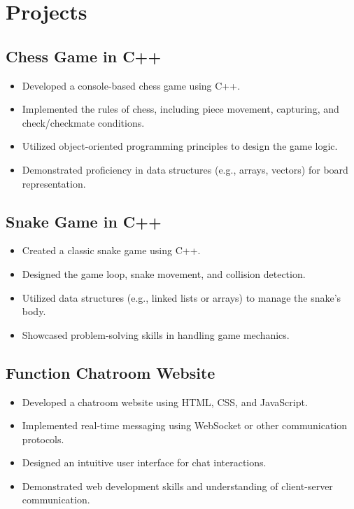 \documentclass[]{deedy-resume-openfont}
\begin{document}
\begin{minipage}[t]{0.66\textwidth} 

\section*{Projects}

\subsection*{Chess Game in C++}
\begin{itemize}
	\item Developed a console-based chess game using C++.
	\item Implemented the rules of chess, including piece movement, capturing, and check/checkmate conditions.
	\item Utilized object-oriented programming principles to design the game logic.
	\item Demonstrated proficiency in data structures (e.g., arrays, vectors) for board representation.
\end{itemize}

\subsection*{Snake Game in C++}
\begin{itemize}
	\item Created a classic snake game using C++.
	\item Designed the game loop, snake movement, and collision detection.
	\item Utilized data structures (e.g., linked lists or arrays) to manage the snake's body.
	\item Showcased problem-solving skills in handling game mechanics.
\end{itemize}

\subsection*{Function Chatroom Website}
\begin{itemize}
	\item Developed a chatroom website using HTML, CSS, and JavaScript.
	\item Implemented real-time messaging using WebSocket or other communication protocols.
	\item Designed an intuitive user interface for chat interactions.
	\item Demonstrated web development skills and understanding of client-server communication.
\end{itemize}


\end{minipage}
\end{document}
